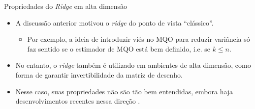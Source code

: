 \documentclass[11pt]{beamer}
\begin{document}
\begin{frame}{Propriedades do \textit{Ridge} em alta dimensão}
	\begin{itemize}
		\item A discussão anterior motivou o \textit{ridge} do ponto de vista ``clássico''.
		\begin{itemize}
			\item Por exemplo, a ideia de introduzir viés no MQO para reduzir variância só faz sentido se o estimador de MQO está bem definido, i.e. se $k \leq n$.
		\end{itemize}
		\item No entanto, o \textit{ridge} também é utilizado em ambientes de alta dimensão, como forma de garantir invertibilidade da matriz de desenho.
		\item Nesse caso, suas propriedades não são tão bem entendidas, embora haja desenvolvimentos recentes nessa direção \citep{Spiess2023}.
	\end{itemize}
\end{frame}
\end{document}
